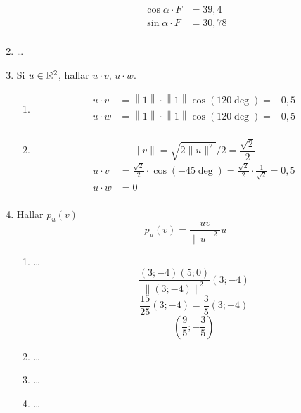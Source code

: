 \documentclass[../practica.root.tex]{subfiles}
\begin{document}
\begin{enumerate}
          \begin{align*}
              \cos\alpha \cdot F & = 39,4  \\
              \sin\alpha \cdot F & = 30,78 \\
          \end{align*}

    \item \dots

    \item Si $u \in \mathbb{R}^2$, hallar $u \cdot v$, $u \cdot w$.
          \begin{enumerate}
              \item
                    \begin{align*}
                        u \cdot v & = \left\| 1 \right\| \cdot \left\| 1 \right\| \cos(120 \deg) = \boxed{-0,5} \\
                        u \cdot w & = \left\| 1 \right\| \cdot \left\| 1 \right\| \cos(120 \deg) = \boxed{-0,5} \\
                    \end{align*}
              \item
                    \[ \|v\| = \sqrt{2\|u\|^2}/2 = \frac{\sqrt{2}}{2}  \]
                    \begin{align*}
                        u \cdot v & = \frac{\sqrt{2}}{2}\cdot \cos(-45\deg) = \frac{\sqrt{2}}{2}\cdot\frac{1}{\sqrt{2}} = \boxed{0,5} \\
                        u \cdot w & = \boxed{0}                                                                                       \\
                    \end{align*}

          \end{enumerate}

    \item Hallar $p_u(v)$
          \[ p_u(v) = \frac{uv}{\|u\|^2}u \]
          \begin{enumerate}
              \item  \dots
                    \[ \frac{(3;-4)(5;0)}{\|(3;-4)\|^2}(3;-4) \]
                    \[ \frac{15}{25}(3;-4) = \frac{3}{5}(3;-4) \]
                    \[ \boxed{\left(\frac{9}{5}; -\frac{3}{5}\right)} \]
              \item  \dots
              \item  \dots
              \item  \dots
          \end{enumerate}


\end{enumerate}
\end{document}
